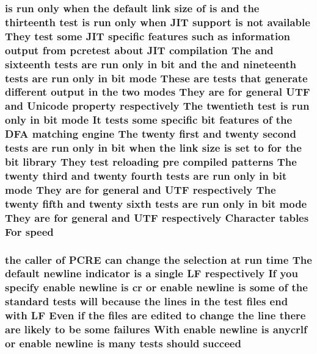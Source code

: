\subsubsection[{\texorpdfstring{speed}{speed}}]{ {\bf is} {\bf run} only when the {\bf default} link {\bf size} {\bf of} {\bf is} and the thirteenth test {\bf is} {\bf run} only when J\+IT {\bf support} {\bf is} {\bf not} {\bf available} They test some J\+IT specific {\bf features} such {\bf as} information {\bf output} {\bf from} {\bf pcretest} about J\+IT {\bf compilation} The and sixteenth {\bf tests} {\bf are} {\bf run} only {\bf in} {\bf bit} and the and nineteenth {\bf tests} {\bf are} {\bf run} only {\bf in} {\bf bit} {\bf mode} These {\bf are} {\bf tests} that generate different {\bf output} {\bf in} the two {\bf modes} They {\bf are} for general U\+TF and {\bf Unicode} property {\bf respectively} The twentieth test {\bf is} {\bf run} only {\bf in} {\bf bit} {\bf mode} It {\bf tests} some specific {\bf bit} {\bf features} {\bf of} the D\+FA {\bf matching} engine The twenty {\bf first} and twenty {\bf second} {\bf tests} {\bf are} {\bf run} only {\bf in} {\bf bit} when the link {\bf size} {\bf is} {\bf set} {\bf to} for the {\bf bit} {\bf library} They test reloading pre {\bf compiled} {\bf patterns} The twenty third and twenty fourth {\bf tests} {\bf are} {\bf run} only {\bf in} {\bf bit} {\bf mode} They {\bf are} for general and U\+TF {\bf respectively} The twenty fifth and twenty sixth {\bf tests} {\bf are} {\bf run} only {\bf in} {\bf bit} {\bf mode} They {\bf are} for general and U\+TF {\bf respectively} Character {\bf tables} For speed}\hypertarget{README_8txt_ad499d23b8180feeed2c5fc54367466e4}{}\label{README_8txt_ad499d23b8180feeed2c5fc54367466e4}
\subsubsection[{\texorpdfstring{succeed}{succeed}}]{\setlength{\rightskip}{0pt plus 5cm}the caller {\bf of} {\bf P\+C\+RE} {\bf can} change the selection at {\bf run} {\bf time} The {\bf default} {\bf newline} indicator {\bf is} {\bf a} single {\bf LF} {\bf respectively} If you specify enable {\bf newline} {\bf is} {\bf cr} {\bf or} enable {\bf newline} {\bf is} some {\bf of} the standard {\bf tests} will because the {\bf lines} {\bf in} the test {\bf files} {\bf end} {\bf with} {\bf LF} Even {\bf if} the {\bf files} {\bf are} edited {\bf to} change the {\bf line} there {\bf are} likely {\bf to} {\bf be} some failures With enable {\bf newline} {\bf is} anycrlf {\bf or} enable {\bf newline} {\bf is} many {\bf tests} should succeed}\hypertarget{README_8txt_a9ed1596605e4e857286eda97bc55d645}{}\label{README_8txt_a9ed1596605e4e857286eda97bc55d645}
